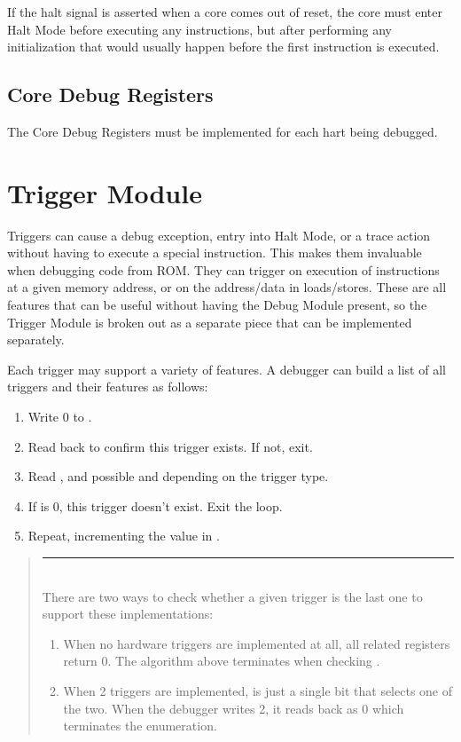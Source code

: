 \documentclass{article}
\newenvironment{commentary}
{
   \begin{quotation}
   \noindent
   \small \em
   \rule{\linewidth}{1pt}\\
}
{
   \end{quotation}
}
\newenvironment{steps}[1]
{
   \vspace{1ex}
   \noindent
   #1
   \begin{enumerate}[nosep]
}
{
   \end{enumerate}
   \vspace{1ex}
}
\begin{document}
If the halt signal is asserted when a core comes out of reset, the core must
enter Halt Mode before executing any instructions, but after performing any
initialization that would usually happen before the first instruction is
executed.

\subsection{Core Debug Registers} \label{debreg}

The Core Debug Registers must be implemented for each hart being debugged.



\section{Trigger Module}

Triggers can cause a debug exception, entry into Halt Mode, or a trace action
without having to execute a special instruction. This makes them invaluable
when debugging code from ROM. They can trigger on execution of instructions at
a given memory address, or on the address/data in loads/stores.  These are all
features that can be useful without having the Debug Module present, so the
Trigger Module is broken out as a separate piece that can be implemented
separately.

\begin{steps}{Each trigger may support a variety of features. A debugger can
    build a list of all triggers and their features as follows:}
\item Write 0 to \Rtselect.
\item Read back \Rtselect to confirm this trigger exists. If not, exit.
\item Read \Rtdataone, and possible \Rtdatatwo and \Rtdatathree depending on the
    trigger type.
\item If \Ftype is 0, this trigger doesn't exist. Exit the loop.
\item Repeat, incrementing the value in \Rtselect.
\end{steps}

\begin{commentary}
    There are two ways to check whether a given trigger is the last one to
    support these implementations:
    \begin{enumerate}
        \item When no hardware triggers are implemented at all, all related
            registers return 0. The algorithm above terminates when checking
            \Ftype.
        \item When 2 triggers are implemented, \Rtselect is just a single bit
            that selects one of the two. When the debugger writes 2, it reads
            back as 0 which terminates the enumeration.
    \end{enumerate}
\end{commentary}
\end{document}
